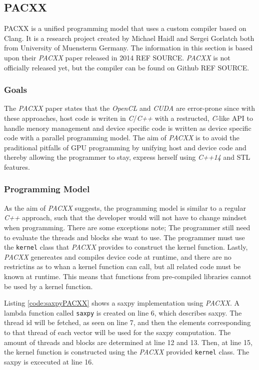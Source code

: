 
\subsection{PACXX}
PACXX is a unified programming model that uses a custom compiler based on Clang. It is a research project created by Michael Haidl and Sergei Gorlatch both from University of Muensterm Germany. The information in this section is based upon their \textit{PACXX} paper released in 2014 REF SOURCE. \textit{PACXX} is not officially released yet, but the compiler can be found on Github REF SOURCE.

\subsubsection{Goals}
The \textit{PACXX} paper states that the \textit{OpenCL} and \textit{CUDA} are error-prone since with these approaches, host code is writen in \textit{C}/\textit{C++} with a restructed, \textit{C}-like API to handle menory management and device specific code is written as device specific code with a parallel programming model. The aim of \textit{PACXX} is to avoid the praditional pitfalls of GPU programming by unifying host and device code and thereby allowing the programmer to stay, express herself using \textit{C++14} and STL features.

\subsubsection{Programming Model}
As the aim of \textit{PACXX} suggests, the programming model is similar to a regular \textit{C++} approach, such that the developer would will not have to change mindset when programming. There are some exceptions note; The programmer still need to evaluate the threads and blocks she want to use. The programmer must use the \texttt{kernel} class that \textit{PACXX} provides to construct the kernel function. Lastly, \textit{PACXX} genereates and compiles device code at runtime, and there are no restrictins as to whan a kernel function can call, but all related code must be known at runtime. This means that functions from pre-compiled libraries cannot be used by a kernel function.

Listing \ref{code:saxpyPACXX} shows a saxpy implementation using \textit{PACXX}. A lambda function called \texttt{saxpy} is created on line 6, which describes saxpy. The thread id will be fetched, as seen on line 7, and then the elements corresponding to that thread of each vector will be used for the saxpy computation. The amount of threads and blocks are determined at line 12 and 13. Then, at line 15, the kernel function is constructed using the \textit{PACXX} provided \texttt{kernel} class. The saxpy is excecuted at line 16.

